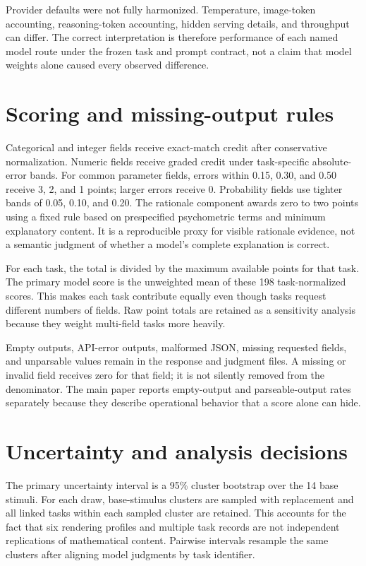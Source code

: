 \documentclass[11pt]{article}
\begin{document}
Provider defaults were not fully harmonized. Temperature, image-token accounting, reasoning-token accounting, hidden serving details, and throughput can differ. The correct interpretation is therefore performance of each named model route under the frozen task and prompt contract, not a claim that model weights alone caused every observed difference.

\section{Scoring and missing-output rules}

Categorical and integer fields receive exact-match credit after conservative normalization. Numeric fields receive graded credit under task-specific absolute-error bands. For common parameter fields, errors within 0.15, 0.30, and 0.50 receive 3, 2, and 1 points; larger errors receive 0. Probability fields use tighter bands of 0.05, 0.10, and 0.20. The rationale component awards zero to two points using a fixed rule based on prespecified psychometric terms and minimum explanatory content. It is a reproducible proxy for visible rationale evidence, not a semantic judgment of whether a model's complete explanation is correct.

For each task, the total is divided by the maximum available points for that task. The primary model score is the unweighted mean of these 198 task-normalized scores. This makes each task contribute equally even though tasks request different numbers of fields. Raw point totals are retained as a sensitivity analysis because they weight multi-field tasks more heavily.

Empty outputs, API-error outputs, malformed JSON, missing requested fields, and unparsable values remain in the response and judgment files. A missing or invalid field receives zero for that field; it is not silently removed from the denominator. The main paper reports empty-output and parseable-output rates separately because they describe operational behavior that a score alone can hide.

\section{Uncertainty and analysis decisions}

The primary uncertainty interval is a 95\% cluster bootstrap over the 14 base stimuli. For each draw, base-stimulus clusters are sampled with replacement and all linked tasks within each sampled cluster are retained. This accounts for the fact that six rendering profiles and multiple task records are not independent replications of mathematical content. Pairwise intervals resample the same clusters after aligning model judgments by task identifier.
\end{document}

